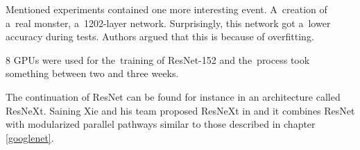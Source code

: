 Mentioned experiments contained one more interesting event. A~creation of a~real 
monster, a~1202-layer network. Surprisingly, this network got a~lower accuracy 
during tests. Authors argued that this is because of overfitting.

8 GPUs were used for the~training of ResNet-152 and the~process took something 
between two and three weeks.

The continuation of ResNet can be found for instance in an architecture called 
ResNeXt. Saining Xie and his team proposed ResNeXt in \cite{resnext} and it 
combines ResNet with modularized parallel pathways similar to those described in 
chapter \ref{googlenet}.



